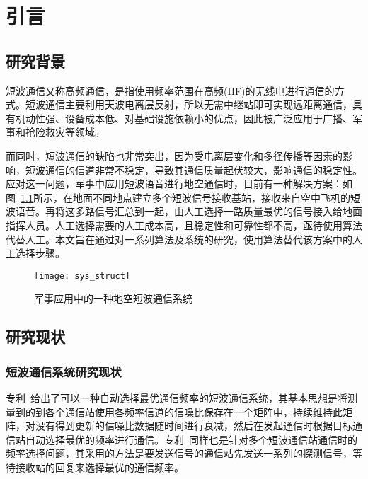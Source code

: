 
\chapter{引言}
\label{chapter:introduction}

\section{研究背景}

短波通信又称高频通信，是指使用频率范围在高频(HF)的无线电进行通信的方式\cite{董彬虹2007短波通信的现状及发展趋势}。短波通信主要利用天波电离层反射，所以无需中继站即可实现远距离通信，具有机动性强、设备成本低、对基础设施依赖小的优点，因此被广泛应用于广播、军事和抢险救灾等领域。

而同时，短波通信的缺陷也非常突出，因为受电离层变化和多径传播等因素的影响，短波通信的信道非常不稳定，导致其通信质量起伏较大，影响通信的稳定性。应对这一问题，军事中应用短波语音进行地空通信时，目前有一种解决方案：如图~\ref{fig:sys_struct}所示，在地面不同地点建立多个短波信号接收基站，接收来自空中飞机的短波语音。再将这多路信号汇总到一起，由人工选择一路质量最优的信号接入给地面指挥人员。人工选择需要的人工成本高，且稳定性和可靠性都不高，亟待使用算法代替人工。本文旨在通过对一系列算法及系统的研究，使用算法替代该方案中的人工选择步骤。

\begin{figure}
\centering
\texttt{[image: sys\_struct]}
\caption{军事应用中的一种地空短波通信系统\label{fig:sys_struct}}
\end{figure}

\section{研究现状}

\subsection{短波通信系统研究现状}



专利~\cite{harmon1982adaptive}给出了可以一种自动选择最优通信频率的短波通信系统，其基本思想是将测量到的到各个通信站使用各频率信道的信噪比保存在一个矩阵中，持续维持此矩阵，对没有得到更新的信噪比数据随时间进行衰减，然后在发起通信时根据目标通信站自动选择最优的频率进行通信。专利~\cite{mcrae1989frequency}同样也是针对多个短波通信站通信时的频率选择问题，其采用的方法是要发送信号的通信站先发送一系列的探测信号，等待接收站的回复来选择最优的通信频率。



